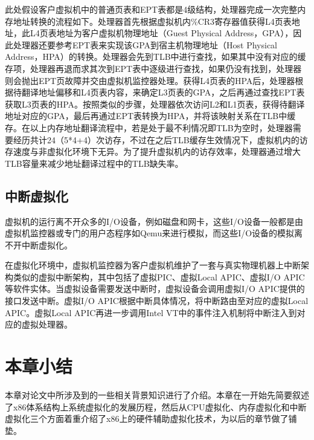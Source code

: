 此处假设客户虚拟机中的普通页表和EPT表都是4级结构，处理器完成一次完整内存地址转换的流程如下。处理器首先根据虚拟机内\%CR3寄存器值获得L4页表地址，此L4页表地址为客户虚拟机物理地址（Guest Physical Address，GPA），因此处理器还要参考EPT表来实现该GPA到宿主机物理地址（Host Physical Address，HPA）的转换。处理器会先到TLB中进行查找，如果其中没有对应的缓存项，处理器再退而求其次到EPT表中逐级进行查找，如果仍没有找到，处理器则会抛出EPT页故障并交由虚拟机监控器处理。获得L4页表的HPA后，处理器根据待翻译地址偏移和L4页表内容，来确定L3页表的GPA，之后再通过查找EPT表获取L3页表的HPA。按照类似的步骤，处理器依次访问L2和L1页表，获得待翻译地址对应的GPA，最后再通过EPT表转换为HPA，并将该映射关系在TLB中缓存。在以上内存地址翻译流程中，若是处于最不利情况即TLB为空时，处理器需要经历共计24（5*4+4）次访存，不过在之后TLB缓存生效情况下，虚拟机内的访存速度与非虚拟化环境下无异。为了提升虚拟机内的访存效率，处理器通过增大TLB容量来减少地址翻译过程中的TLB缺失率。

\subsection{中断虚拟化}

虚拟机的运行离不开众多的I/O设备，例如磁盘和网卡，这些I/O设备一般都是由虚拟机监控器或专门的用户态程序如Qemu来进行模拟，而这些I/O设备的模拟离不开中断虚拟化。

在虚拟化环境中，虚拟机监控器为客户虚拟机维护了一套与真实物理机器上中断架构类似的虚拟中断架构，其中包括了虚拟PIC、虚拟Local APIC、虚拟I/O APIC等软件实体。当虚拟设备需要发送中断时，虚拟设备会调用虚拟I/O APIC提供的接口发送中断。虚拟I/O APIC根据中断具体情况，将中断路由至对应的虚拟Local APIC。虚拟Local APIC再进一步调用Intel VT中的事件注入机制将中断注入到对应的虚拟处理器。

\section{本章小结}

本章对论文中所涉及到的一些相关背景知识进行了介绍。本章在一开始先简要叙述了x86体系结构上系统虚拟化的发展历程，然后从CPU虚拟化、内存虚拟化和中断虚拟化三个方面着重介绍了x86上的硬件辅助虚拟化技术，为以后的章节做了铺垫。